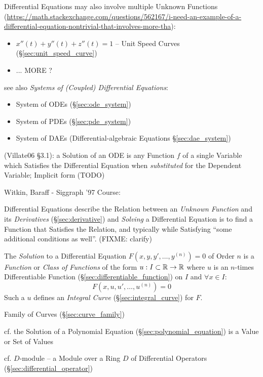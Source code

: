 Differential Equations may also involve multiple Unknown Functions
(\url{https://math.stackexchange.com/questions/562167/i-need-an-example-of-a-differential-equation-nontrivial-that-involves-more-tha}):
\begin{itemize}
  \item $x''(t) + y''(t) + z''(t) = 1$ -- Unit Speed Curves
    (\S\ref{sec:unit_speed_curve})
  \item ... MORE ?
\end{itemize}

see also \emph{Systems of (Coupled) Differential Equations}:
\begin{itemize}
  \item System of ODEs (\S\ref{sec:ode_system})
  \item System of PDEs (\S\ref{sec:pde_system})
  \item System of DAEs (Differential-algebraic Equations \S\ref{sec:dae_system})
\end{itemize}

(Villate06 \S 3.1): a Solution of an ODE is any Function $f$ of a single
Variable which Satisfies the Differential Equation when \emph{substituted} for
the Dependent Variable; Implicit form (TODO)

Witkin, Baraff - Siggraph '97 Course:

Differential Equations describe the Relation between an \emph{Unknown Function}
and its \emph{Derivatives} (\S\ref{sec:derivative}) and \emph{Solving} a
Differential Equation is to find a Function that Satisfies the Relation, and
typically while Satisfying ``some additional conditions as well''. (FIXME:
clarify)

\asterism

The \emph{Solution} to a Differential Equation $F(x,y,y',\ldots,y^{(n)}) = 0$
of Order $n$ is a \emph{Function} or \emph{Class of Functions} of the form $u :
I \subset \mathbb{R} \rightarrow \mathbb{R}$ where $u$ is an $n$-times Differentiable
Function (\S\ref{sec:differentiable_function}) on $I$ and $\forall x \in I$:
\[
  F(x,u,u',\ldots,u^{(n)}) = 0
\]
Such a $u$ defines an \emph{Integral Curve} (\S\ref{sec:integral_curve}) for
$F$.

\fist Family of Curves (\S\ref{sec:curve_family})

\fist cf. the Solution of a Polynomial Equation
(\S\ref{sec:polynomial_equation}) is a Value or Set of Values

\fist cf. $D$-module -- a Module over a Ring $D$ of Differential Operators
(\S\ref{sec:differential_operator})

